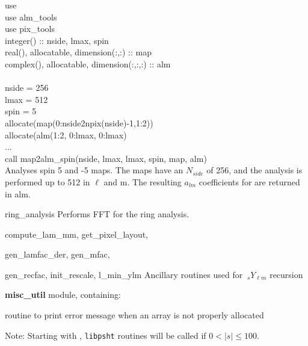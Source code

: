 \begin{example}
{
use \\
use alm\_tools\\
use pix\_tools\\
integer() :: nside, lmax, spin \\
real(), allocatable, dimension(:,:) :: map \\
complex(), allocatable, dimension(:,:,:) :: alm \\
\\
nside = 256 \\
lmax = 512 \\
spin = 5 \\
allocate(map(0:nside2npix(nside)-1,1:2)) \\
allocate(alm(1:2, 0:lmax, 0:lmax)\\
...\\
call map2alm\_spin(nside, lmax, lmax, spin, map, alm)  \\
}
{
Analyses spin 5 and -5 maps. The maps have
an $N_{side}$ of 256, and the analysis is performed up
to 512 in $\ell$ and m. The resulting $a_{lm}$ coefficients for
are returned in alm.
}
\end{example}

\begin{modules}
  \begin{sulist}{} %
  \item[ring\_analysis] Performs FFT for the ring analysis.
  \item[compute\_lam\_mm, get\_pixel\_layout, ]
  \item[gen\_lamfac\_der, gen\_mfac,  ] 
  \item[gen\_recfac, init\_rescale, l\_min\_ylm] Ancillary routines used
  for $\ {_s}Y_{\ell m}$ recursion
  \item[\textbf{misc\_util}] module, containing:
  \item[\htmlref{assert\_alloc}{sub:assert}] routine to print error message when an array is not
  properly allocated		
  \end{sulist}
Note: Starting with , {\tt libpsht} routines will be called if $0<|s|\le100$.
\end{modules}

